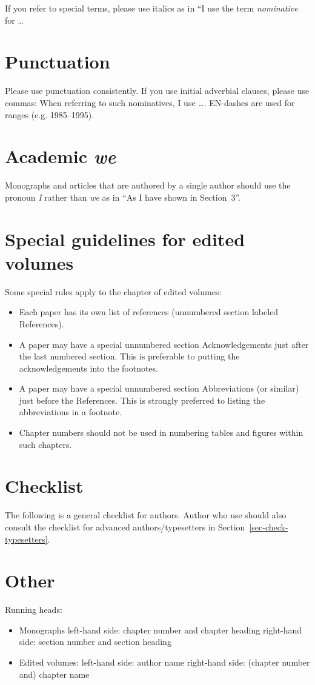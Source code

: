 If you refer to special terms, please use italics as in ``I 
use the term \emph{nominative} for \ldots



\section{Punctuation}
Please use punctuation consistently. 
If you use initial adverbial clauses, please use commas: When referring to such nominatives, I use {\ldots}.
EN-dashes are used for ranges (e.g. 1985–1995).

\section{Academic \emph{we}}

Monographs and articles that are authored by a single author should use the pronoun \emph{I} rather
than \emph{we} as in ``As I have shown in Section~3''.	

\section{Special guidelines for edited volumes}


Some special rules apply to the chapter of edited volumes:
\begin{itemize}
\item Each paper has its own list of references (unnumbered section labeled References).
\item A paper may have a special unnumbered section Acknowledgements just after the last numbered section. This is preferable to putting the acknowledgements into the footnotes.
\item A paper may have a special unnumbered section Abbreviations (or similar) just before the References. This is strongly preferred to listing the abbreviations in a footnote.
\item Chapter numbers should not be used in numbering tables and figures within such chapters.
\end{itemize}


\section{Checklist}

The following is a general checklist for authors. Author who use \latex should also consult the
checklist for advanced authors/typesetters in Section~\ref{sec-check-typesetters}.

\section{Other}

Running heads:
\begin{itemize}
\item Monographs
left-hand side: chapter number and chapter heading 
right-hand side: section number and section heading
\item Edited volumes:
left-hand side: author name
right-hand side: (chapter number and) chapter name
\end{itemize}

